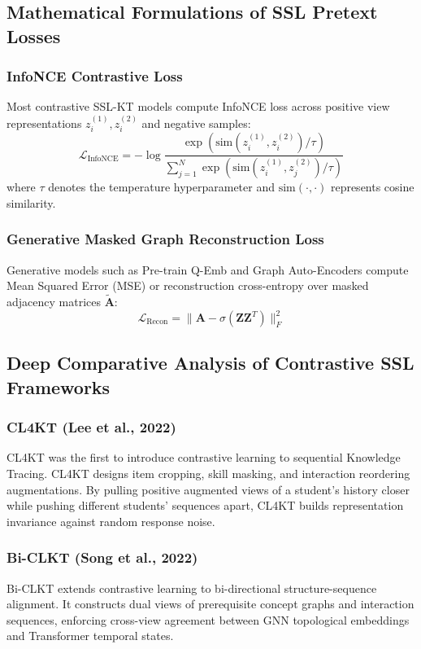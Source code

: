 ﻿\documentclass[10pt,journal,compsoc]{IEEEtran}
\begin{document}
\subsection{Mathematical Formulations of SSL Pretext Losses}

\subsubsection{InfoNCE Contrastive Loss}
Most contrastive SSL-KT models compute InfoNCE loss across positive view representations $z_i^{(1)}, z_i^{(2)}$ and negative samples:
\begin{equation}
\mathcal{L}_{\text{InfoNCE}} = -\log \frac{\exp(\text{sim}(z_i^{(1)}, z_i^{(2)}) / \tau)}{\sum_{j=1}^{N} \exp(\text{sim}(z_i^{(1)}, z_j^{(2)}) / \tau)}
\end{equation}
where $\tau$ denotes the temperature hyperparameter and $\text{sim}(\cdot, \cdot)$ represents cosine similarity.

\subsubsection{Generative Masked Graph Reconstruction Loss}
Generative models such as Pre-train Q-Emb \cite{KT026_PretrainQ_2020} and Graph Auto-Encoders compute Mean Squared Error (MSE) or reconstruction cross-entropy over masked adjacency matrices $\tilde{\mathbf{A}}$:
\begin{equation}
\mathcal{L}_{\text{Recon}} = \|\mathbf{A} - \sigma(\mathbf{Z} \mathbf{Z}^T)\|_F^2
\end{equation}

\subsection{Deep Comparative Analysis of Contrastive SSL Frameworks}

\subsubsection{CL4KT (Lee et al., 2022)}
CL4KT \cite{KT039_CL4KT_2022} was the first to introduce contrastive learning to sequential Knowledge Tracing. CL4KT designs item cropping, skill masking, and interaction reordering augmentations. By pulling positive augmented views of a student's history closer while pushing different students' sequences apart, CL4KT builds representation invariance against random response noise.

\subsubsection{Bi-CLKT (Song et al., 2022)}
Bi-CLKT \cite{KT011_BiCLKT_2022} extends contrastive learning to bi-directional structure-sequence alignment. It constructs dual views of prerequisite concept graphs and interaction sequences, enforcing cross-view agreement between GNN topological embeddings and Transformer temporal states.
\end{document}
